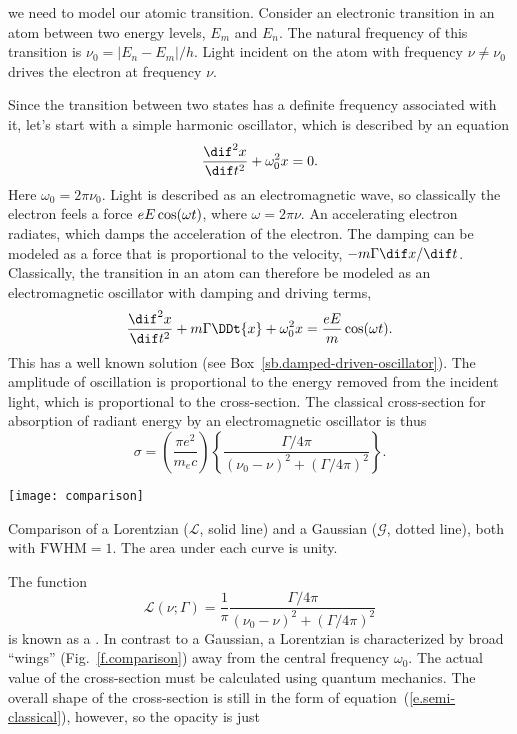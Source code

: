  we need to model our atomic transition. Consider an electronic transition in an atom between two energy levels, $E_m$ and $E_n$. The natural frequency of this transition is $\nu_0 = |E_n-E_m|/h$. Light incident on the atom with frequency $\nu\neq\nu_0$ drives the electron at frequency $\nu$. 

Since the transition between two states has a definite frequency associated with it, let's start with a simple harmonic oscillator, which is described by an equation
\[
	\DDtt{x} + \omega_{0}^{2} x = 0.
\]
Here $\omega_{0} = 2\pi\nu_{0}$. Light is described as an electromagnetic wave, so classically the electron feels a force $eE\cos(\omega t)$, where $\omega = 2\pi \nu$. An accelerating electron radiates, which damps the acceleration of the electron. The damping can be modeled as a force that is proportional to the velocity, $-m\Gamma \dif x/\dif t$. Classically, the transition in an atom can therefore be modeled as an electromagnetic oscillator with damping and driving terms,
\[
	\DDtt{x} + m\Gamma\DDt{x} + \omega_{0}^{2}x = \frac{eE}{m}\cos(\wt).
\]
This has a well known solution (see Box~\ref{sb.damped-driven-oscillator}). The amplitude of oscillation is proportional to the energy removed from the incident light, which is proportional to the cross-section. The classical cross-section for absorption of radiant energy by an electromagnetic oscillator is thus
\begin{equation}\label{e.semi-classical}
    \sigma = \left(\frac{\pi e^2}{m_e c}\right)
    \left\{\frac{\Gamma/4\pi}{(\nu_0-\nu)^2 + (\Gamma/4\pi)^2}\right\}.
\end{equation}
\begin{marginfigure}
\texttt{[image: comparison]}
\caption[Comparison of Lorentzian and Gaussian distributions]{\label{f.comparison}
Comparison of a Lorentzian ($\mathcal{L}$, solid line) and a Gaussian ($\mathcal{G}$, dotted line), both with $\mathrm{FWHM}=1$. The area under each curve is unity.}
\end{marginfigure}
The function
\[
    \mathcal{L}(\nu;\Gamma) = \frac{1}{\pi} 
        \frac{\Gamma/4\pi}{(\nu_0-\nu)^2 + (\Gamma/4\pi)^2}
\]
is known as a .  In contrast to a Gaussian, a Lorentzian is characterized by broad ``wings'' (Fig.~\ref{f.comparison}) away from the central frequency $\omega_{0}$.
The actual value of the cross-section must be calculated using quantum mechanics. The overall shape of the cross-section is still in the form of equation~(\ref{e.semi-classical}), however, so the opacity is just
